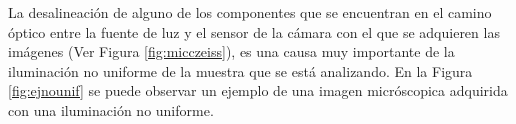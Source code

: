 La desalineación de alguno de los componentes que se encuentran en el camino óptico entre la fuente de luz y el sensor de la cámara con el que se adquieren las imágenes (Ver Figura \ref{fig:micczeiss}), es una causa muy importante de la iluminación no uniforme de la muestra que se está analizando. En la Figura \ref{fig:ejnounif} se puede observar un ejemplo de una imagen micróscopica adquirida con una iluminación no uniforme.
	\begin{figure}[H]
		\begin{floatrow}
		\end{floatrow}
	\end{figure}
	
